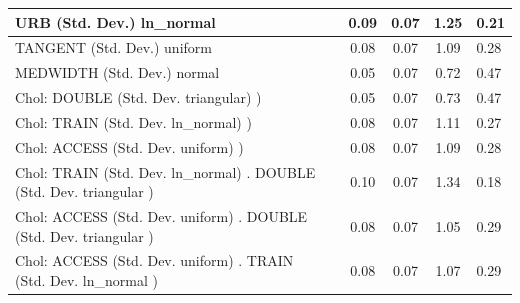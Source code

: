 \begin{table}
\begin{center}
\begin{tabular}{|l|l|c|c|c|l|}
			\hline
			URB (Std. Dev.) ln_normal &  & 0.09 & 0.07 & 1.25 & 0.21 \\
			\hline
			TANGENT (Std. Dev.) uniform &  & 0.08 & 0.07 & 1.09 & 0.28 \\
			\hline
			MEDWIDTH (Std. Dev.) normal &  & 0.05 & 0.07 & 0.72 & 0.47 \\
			\hline
			 Chol: DOUBLE (Std. Dev. triangular) ) &  & 0.05 & 0.07 & 0.73 & 0.47 \\
			\hline
			 Chol: TRAIN (Std. Dev. ln_normal) ) &  & 0.08 & 0.07 & 1.11 & 0.27 \\
			\hline
			 Chol: ACCESS (Std. Dev. uniform) ) &  & 0.08 & 0.07 & 1.09 & 0.28 \\
			\hline
			 Chol: TRAIN (Std. Dev. ln_normal) . DOUBLE (Std. Dev.   triangular ) &  & 0.10 & 0.07 & 1.34 & 0.18 \\
			\hline
			 Chol: ACCESS (Std. Dev. uniform) . DOUBLE (Std. Dev.   triangular ) &  & 0.08 & 0.07 & 1.05 & 0.29 \\
			\hline
			 Chol: ACCESS (Std. Dev. uniform) . TRAIN (Std. Dev.   ln_normal ) &  & 0.08 & 0.07 & 1.07 & 0.29 \\
			\hline
		\end{tabular}
	\end{center}
\end{table}